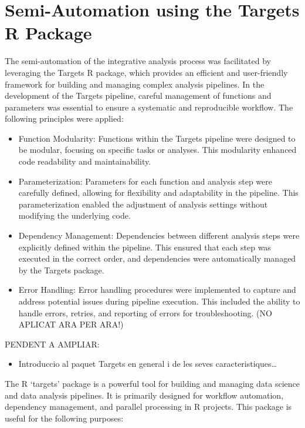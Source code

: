 \documentclass[a4paper, nobind]{templates/ociamthesis}
\providecommand{\tightlist}{%
  \setlength{\itemsep}{0pt}\setlength{\parskip}{0pt}}
\begin{document}
\hypertarget{semi-automation-using-the-targets-r-package}{%
\section{Semi-Automation using the Targets R Package}\label{semi-automation-using-the-targets-r-package}}

The semi-automation of the integrative analysis process was facilitated by leveraging the Targets R package, which provides an efficient and user-friendly framework for building and managing complex analysis pipelines. In the development of the Targets pipeline, careful management of functions and parameters was essential to ensure a systematic and reproducible workflow. The following principles were applied:

\begin{itemize}
\item
  Function Modularity: Functions within the Targets pipeline were designed to be modular, focusing on specific tasks or analyses. This modularity enhanced code readability and maintainability.
\item
  Parameterization: Parameters for each function and analysis step were carefully defined, allowing for flexibility and adaptability in the pipeline. This parameterization enabled the adjustment of analysis settings without modifying the underlying code.
\item
  Dependency Management: Dependencies between different analysis steps were explicitly defined within the pipeline. This ensured that each step was executed in the correct order, and dependencies were automatically managed by the Targets package.
\item
  Error Handling: Error handling procedures were implemented to capture and address potential issues during pipeline execution. This included the ability to handle errors, retries, and reporting of errors for troubleshooting. (NO APLICAT ARA PER ARA!)
\end{itemize}

PENDENT A AMPLIAR:

\begin{itemize}
\tightlist
\item
  Introduccio al paquet Targets en general i de les seves caracteristiques\ldots{}
\end{itemize}

The R `targets' package is a powerful tool for building and managing data science and data analysis pipelines. It is primarily designed for workflow automation, dependency management, and parallel processing in R projects. This package is useful for the following purposes:
\end{document}
